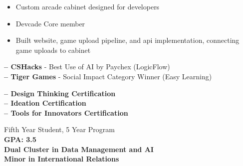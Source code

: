 \documentclass[10pt,a4paper,ragged2e,withhyper]{altacv}
\begin{document}
\begin{paracol}{2}
\divider

\begin{itemize}
    \item Custom arcade cabinet designed for developers
    \item Devcade Core member
    \item Built website, game upload pipeline, and api implementation, connecting game uploads to cabinet
\end{itemize}\par



\textbf{ -- CSHacks} - Best Use of AI by Paychex (LogicFlow)\\
\textbf{ -- Tiger Games} - Social Impact Category Winner (Easy Learning)\\

\divider

\textbf{ -- Design Thinking Certification}\\
\textbf{ -- Ideation Certification}\\
\textbf{ -- Tools for Innovators Certification}

\switchcolumn


Fifth Year Student, 5 Year Program\\
\textbf{GPA: 3.5}\\
\textbf{Dual Cluster in Data Management and AI}\\
\textbf{Minor in International Relations}\\

\medskip


\par\smallskip
{}
\par\smallskip
\divider

\par\smallskip
{}
\par\smallskip
{}
\par



\end{paracol}
\end{document}

